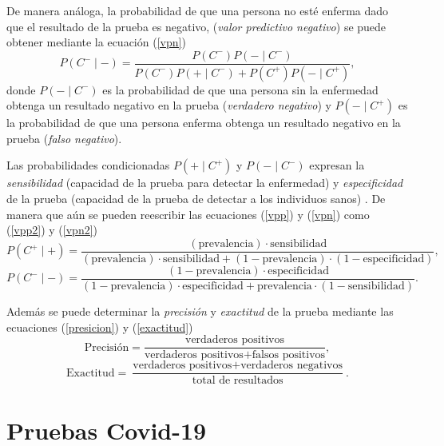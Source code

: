 \documentclass[12pt]{article}
\begin{document}
	De manera análoga, la probabilidad de que una persona no esté enferma dado que el resultado de la prueba es negativo, ({\em valor predictivo negativo}) se puede obtener mediante la ecuación (\ref{vpn})
	\begin{equation}
	P(C^- \mid -) = \frac{P(C^-)P(- \mid C^-)}{P(C^-)P(+ \mid C^-) + P(C^+) P(- \mid C^+)},
	\label{vpn}
	\end{equation}
	donde $P(- \mid C^-)$ es la probabilidad de que una persona sin la enfermedad obtenga un resultado negativo en la prueba ({\em verdadero negativo}) y $P(- \mid C^+)$ es la probabilidad de que una persona enferma obtenga un resultado negativo en la prueba ({\em falso negativo}).
	
	Las probabilidades condicionadas $P(+ \mid C^+)$ y $P(- \mid C^-)$ expresan la {\em sensibilidad} (capacidad de la prueba para detectar la enfermedad) y {\em especificidad} de la prueba (capacidad de la prueba de detectar a los individuos sanos) \cite{lect3}. De manera que aún se pueden reescribir \cite{regalado2009} las ecuaciones (\ref{vpp}) y (\ref{vpn}) como (\ref{vpp2}) y (\ref{vpn2})
	\begin{equation}
	P(C^+ \mid +) = \frac{(\text{prevalencia}) \cdot \text{sensibilidad}}{(\text{prevalencia}) \cdot \text{sensibilidad} + (1-\text{prevalencia})\cdot(1- \text{especificidad})}, 
	\label{vpp2}
	\end{equation}
	\begin{equation}
	P(C^- \mid -) = \frac{(1- \text{prevalencia}) \cdot \text{especificidad}}{(1- \text{prevalencia}) \cdot \text{especificidad} + \text{prevalencia} \cdot  (1- \text{sensibilidad})}. 
	\label{vpn2}
	\end{equation} 
	
	Además se puede determinar la {\em precisión} y {\em exactitud} \cite{lect3} de la prueba mediante las ecuaciones (\ref{presicion}) y (\ref{exactitud})
	\begin{equation}
	\text{Precisión} = \frac{\text{verdaderos positivos}}{\text{verdaderos positivos} + \text{falsos positivos}}, 
	\label{presicion}
	\end{equation}
	\begin{equation}
	\text{Exactitud} = \frac{\text{verdaderos positivos} + \text{verdaderos negativos}}{\text{total de resultados}}.
	\label{exactitud} 
	\end{equation}
	
	\section{Pruebas Covid-19}
	
\end{document}

